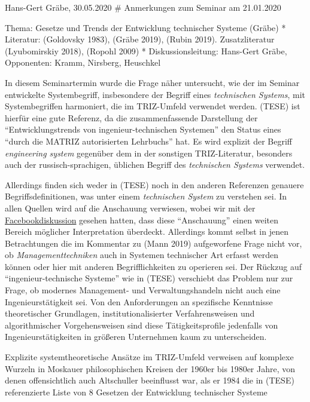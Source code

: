 \documentclass[11pt,a4paper]{article}
\begin{document}
Hans-Gert Gräbe, 30.05.2020 \# Anmerkungen zum Seminar am 21.01.2020

Thema: Gesetze und Trends der Entwicklung technischer Systeme (Gräbe) *
Literatur: (Goldovsky 1983), (Gräbe 2019), (Rubin 2019). Zusatzliteratur
(Lyubomirskiy 2018), (Ropohl 2009) * Diskussionsleitung: Hans-Gert
Gräbe, Opponenten: Kramm, Nirsberg, Heuschkel

In diesem Seminartermin wurde die Frage näher untersucht, wie der im
Seminar entwickelte Systembegriff, insbesondere der Begriff eines
\emph{technischen Systems}, mit Systembegriffen harmoniert, die im
TRIZ-Umfeld verwendet werden. (TESE) ist hierfür eine gute Referenz, da
die zusammenfassende Darstellung der ``Entwicklungstrends von
ingenieur-technischen Systemen'' den Status eines ``durch die MATRIZ
autorisierten Lehrbuchs'' hat. Es wird explizit der Begriff
\emph{engineering system} gegenüber dem in der sonstigen TRIZ-Literatur,
besonders auch der russisch-sprachigen, üblichen Begriff des
\emph{technischen Systems} verwendet.

Allerdings finden sich weder in (TESE) noch in den anderen Referenzen
genauere Begriffsdefinitionen, was unter einem \emph{technischen System}
zu verstehen sei. In allen Quellen wird auf die Anschauung verwiesen,
wobei wir mit der
\href{https://wumm-project.github.io/2019-08-07}{Facebookdiskussion}
gesehen hatten, dass diese ``Anschauung'' einen weiten Bereich möglicher
Interpretation überdeckt. Allerdings kommt selbst in jenen Betrachtungen
die im Kommentar zu (Mann 2019) aufgeworfene Frage nicht vor, ob
\emph{Managementtechniken} auch in Systemen technischer Art erfasst
werden können oder hier mit anderen Begrifflichkeiten zu operieren sei.
Der Rückzug auf ``ingenieur-technische Systeme'' wie in (TESE)
verschiebt das Problem nur zur Frage, ob modernes Management- und
Verwaltungshandeln nicht auch eine Ingenieurstätigkeit sei. Von den
Anforderungen an spezifische Kenntnisse theoretischer Grundlagen,
institutionalisierter Verfahrensweisen und algorithmischer
Vorgehensweisen sind diese Tätigkeitsprofile jedenfalls von
Ingenieurstätigkeiten in größeren Unternehmen kaum zu unterscheiden.

Explizite systemtheoretische Ansätze im TRIZ-Umfeld verweisen auf
komplexe Wurzeln in Moskauer philosophischen Kreisen der 1960er bis
1980er Jahre, von denen offensichtlich auch Altschuller beeinflusst war,
als er 1984 die in (TESE) referenzierte Liste von 8 Gesetzen der
Entwicklung technischer Systeme
\end{document}
